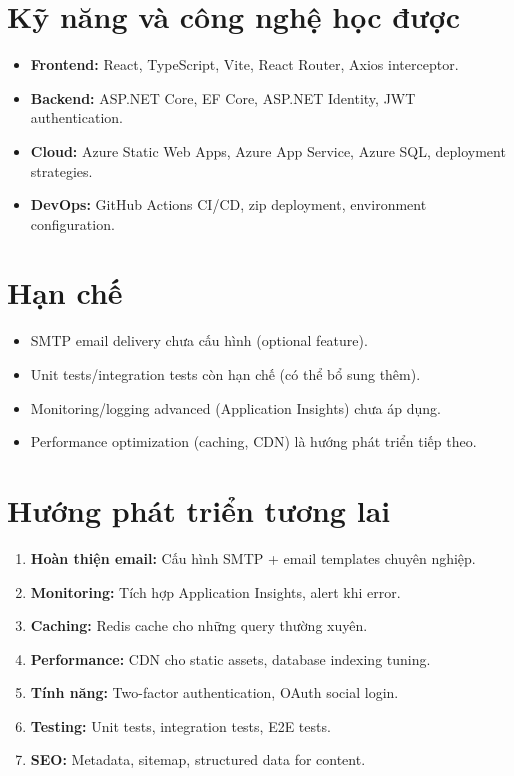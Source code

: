 \documentclass[12pt,a4paper,oneside]{report}
\begin{document}
\section{Kỹ năng và công nghệ học được}

\begin{itemize}[itemsep=2pt]
  \item \textbf{Frontend:} React, TypeScript, Vite, React Router, Axios interceptor.
  \item \textbf{Backend:} ASP.NET Core, EF Core, ASP.NET Identity, JWT authentication.
  \item \textbf{Cloud:} Azure Static Web Apps, Azure App Service, Azure SQL, deployment strategies.
  \item \textbf{DevOps:} GitHub Actions CI/CD, zip deployment, environment configuration.
\end{itemize}

\section{Hạn chế}

\begin{itemize}[itemsep=2pt]
  \item SMTP email delivery chưa cấu hình (optional feature).
  \item Unit tests/integration tests còn hạn chế (có thể bổ sung thêm).
  \item Monitoring/logging advanced (Application Insights) chưa áp dụng.
  \item Performance optimization (caching, CDN) là hướng phát triển tiếp theo.
\end{itemize}

\section{Hướng phát triển tương lai}

\begin{enumerate}[itemsep=3pt]
  \item \textbf{Hoàn thiện email:} Cấu hình SMTP + email templates chuyên nghiệp.
  
  \item \textbf{Monitoring:} Tích hợp Application Insights, alert khi error.
  
  \item \textbf{Caching:} Redis cache cho những query thường xuyên.
  
  \item \textbf{Performance:} CDN cho static assets, database indexing tuning.
  
  \item \textbf{Tính năng:} Two-factor authentication, OAuth social login.
  
  \item \textbf{Testing:} Unit tests, integration tests, E2E tests.
  
  \item \textbf{SEO:} Metadata, sitemap, structured data for content.
\end{enumerate}
\end{document}
